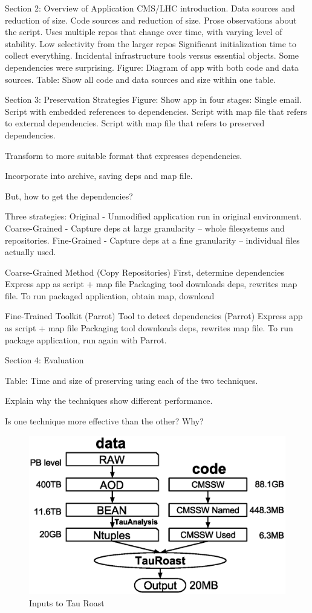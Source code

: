 \documentclass[procedia]{easychair}
\begin{document}
Section 2: Overview of Application
    CMS/LHC introduction.
    Data sources and reduction of size.
    Code sources and reduction of size.
    Prose observations about the script.
        Uses multiple repos that change over time, with varying level of stability.
        Low selectivity from the larger repos
        Significant initialization time to collect everything.
        Incidental infrastructure tools versus essential objects.
        Some dependencies were surprising.
    Figure: Diagram of app with both code and data sources.
    Table: Show all code and data sources and size within one table.

Section 3: Preservation Strategies
    Figure: Show app in four stages:
        Single email.
        Script with embedded references to dependencies.
        Script with map file that refers to external dependencies.
        Script with map file that refers to preserved dependencies.

    Transform to more suitable format that expresses dependencies.

    Incorporate into archive, saving deps and map file.

    But, how to get the dependencies?

    Three strategies:
        Original - Unmodified application run in original environment.
        Coarse-Grained - Capture deps at large granularity -- whole filesystems and repositories.
        Fine-Grained - Capture deps at a fine granularity -- individual files actually used.

    Coarse-Grained Method (Copy Repositories)
        First, determine dependencies
        Express app as script + map file
        Packaging tool downloads deps, rewrites map file.
        To run packaged application, obtain map, download

    Fine-Trained Toolkit (Parrot)
        Tool to detect dependencies (Parrot)
        Express app as script + map file
        Packaging tool downloads deps, rewrites map file.
        To run package application, run again with Parrot.

Section 4: Evaluation

    Table: Time and size of preserving using each of the two techniques.

    Explain why the techniques show different performance.

    Is one technique more effective than the other?  Why?
\fi

\begin{figure}[t]
\centering
\includegraphics[width=.5\textwidth]{data-code-size.eps}
\caption{Inputs to Tau Roast}
\label{fig:data-code-size}
\end{figure}
\end{document}
